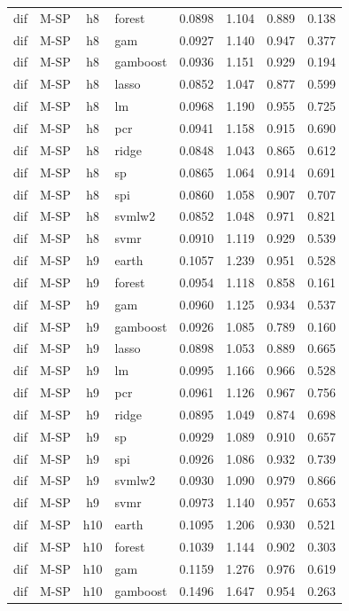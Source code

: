 \begin{ThreePartTable}
\begin{longtable}[t]{llclcccc}
dif & M-SP & h8 & forest & 0.0898 & 1.104 & 0.889 & 0.138\\
dif & M-SP & h8 & gam & 0.0927 & 1.140 & 0.947 & 0.377\\
dif & M-SP & h8 & gamboost & 0.0936 & 1.151 & 0.929 & 0.194\\
dif & M-SP & h8 & lasso & 0.0852 & 1.047 & 0.877 & 0.599\\
dif & M-SP & h8 & lm & 0.0968 & 1.190 & 0.955 & 0.725\\
dif & M-SP & h8 & pcr & 0.0941 & 1.158 & 0.915 & 0.690\\
dif & M-SP & h8 & ridge & 0.0848 & 1.043 & 0.865 & 0.612\\
dif & M-SP & h8 & sp & 0.0865 & 1.064 & 0.914 & 0.691\\
dif & M-SP & h8 & spi & 0.0860 & 1.058 & 0.907 & 0.707\\
dif & M-SP & h8 & svmlw2 & 0.0852 & 1.048 & 0.971 & 0.821\\
dif & M-SP & h8 & svmr & 0.0910 & 1.119 & 0.929 & 0.539\\
\addlinespace
dif & M-SP & h9 & earth & 0.1057 & 1.239 & 0.951 & 0.528\\
dif & M-SP & h9 & forest & 0.0954 & 1.118 & 0.858 & 0.161\\
dif & M-SP & h9 & gam & 0.0960 & 1.125 & 0.934 & 0.537\\
dif & M-SP & h9 & gamboost & 0.0926 & 1.085 & 0.789 & 0.160\\
dif & M-SP & h9 & lasso & 0.0898 & 1.053 & 0.889 & 0.665\\
dif & M-SP & h9 & lm & 0.0995 & 1.166 & 0.966 & 0.528\\
dif & M-SP & h9 & pcr & 0.0961 & 1.126 & 0.967 & 0.756\\
dif & M-SP & h9 & ridge & 0.0895 & 1.049 & 0.874 & 0.698\\
dif & M-SP & h9 & sp & 0.0929 & 1.089 & 0.910 & 0.657\\
dif & M-SP & h9 & spi & 0.0926 & 1.086 & 0.932 & 0.739\\
dif & M-SP & h9 & svmlw2 & 0.0930 & 1.090 & 0.979 & 0.866\\
dif & M-SP & h9 & svmr & 0.0973 & 1.140 & 0.957 & 0.653\\
\addlinespace
dif & M-SP & h10 & earth & 0.1095 & 1.206 & 0.930 & 0.521\\
dif & M-SP & h10 & forest & 0.1039 & 1.144 & 0.902 & 0.303\\
dif & M-SP & h10 & gam & 0.1159 & 1.276 & 0.976 & 0.619\\
dif & M-SP & h10 & gamboost & 0.1496 & 1.647 & 0.954 & 0.263\\

\end{longtable}
\end{ThreePartTable}
